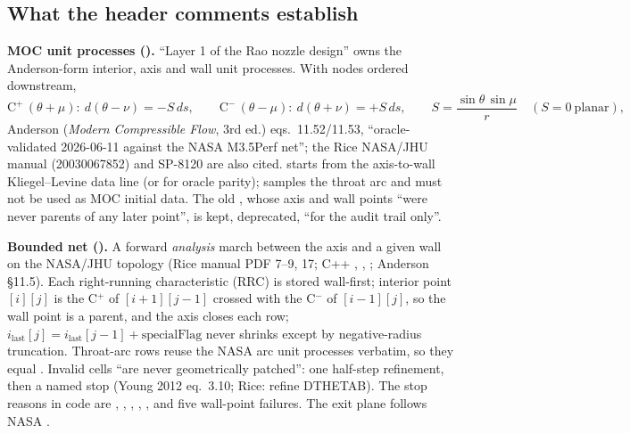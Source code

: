\subsection{What the header comments establish}

\textbf{MOC unit processes ().} ``Layer 1 of the Rao nozzle design'' owns the Anderson-form
interior, axis and wall unit processes. With nodes ordered downstream,
\begin{equation}
\text{C}^{+}\,(\theta+\mu):\ d(\theta-\nu) = -S\,ds,\qquad
\text{C}^{-}\,(\theta-\mu):\ d(\theta+\nu) = +S\,ds,\qquad
S = \frac{\sin\theta\,\sin\mu}{r}\quad(S=0\ \text{planar}),
\end{equation}
Anderson (\emph{Modern Compressible Flow}, 3rd ed.) eqs.~11.52/11.53, ``oracle-validated 2026-06-11 against the
NASA M3.5Perf net''; the Rice NASA/JHU manual (20030067852) and SP-8120 are also cited. 
starts from the axis-to-wall Kliegel--Levine data line (or  for oracle
parity);  samples the throat arc and must not be used as MOC initial data. The
old , whose axis and wall points ``were never parents of any later point'', is kept,
deprecated, ``for the audit trail only''.

\textbf{Bounded net ().} A forward \emph{analysis} march between the axis and a given wall
on the NASA/JHU topology (Rice manual PDF 7--9, 17; C++ , ,
; Anderson \S11.5). Each right-running characteristic (RRC) is stored wall-first; interior
point $[i][j]$ is the C$^+$ of $[i+1][j-1]$ crossed with the C$^-$ of $[i-1][j]$, so the wall point is a parent,
and the axis closes each row; $i_{\text{last}}[j] = i_{\text{last}}[j-1] + \text{specialFlag}$ never shrinks except
by negative-radius truncation. Throat-arc rows reuse the NASA arc unit processes verbatim, so they equal
. Invalid cells ``are never geometrically patched'': one half-step refinement, then a named
stop (Young 2012 eq.~3.10; Rice: refine DTHETAB). The stop reasons in code are ,
, , , ,  and
five wall-point failures. The exit plane follows NASA .

